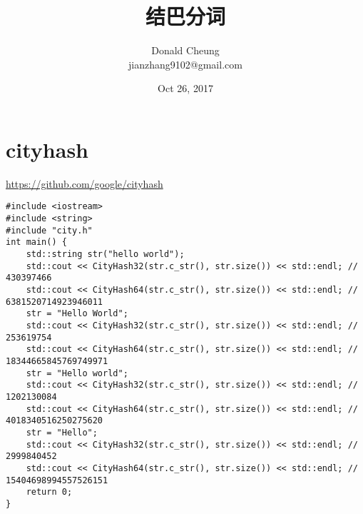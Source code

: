 \documentclass[10pt,a4paper]{ctexbook}
\begin{document}
    \setlength{\baselineskip}{20pt}
    \title{结巴分词}
    \author{Donald Cheung\\jianzhang9102@gmail.com}
    \date{Oct 26, 2017}
    \tableofcontents
\fi

\chapter{cityhash}
\url{https://github.com/google/cityhash}

\begin{verbatim}
#include <iostream>
#include <string>
#include "city.h"
int main() {
    std::string str("hello world");
    std::cout << CityHash32(str.c_str(), str.size()) << std::endl; // 430397466
    std::cout << CityHash64(str.c_str(), str.size()) << std::endl; // 6381520714923946011
    str = "Hello World";
    std::cout << CityHash32(str.c_str(), str.size()) << std::endl; // 253619754
    std::cout << CityHash64(str.c_str(), str.size()) << std::endl; // 18344665845769749971
    str = "Hello world";
    std::cout << CityHash32(str.c_str(), str.size()) << std::endl; // 1202130084
    std::cout << CityHash64(str.c_str(), str.size()) << std::endl; // 4018340516250275620
    str = "Hello";
    std::cout << CityHash32(str.c_str(), str.size()) << std::endl; // 2999840452
    std::cout << CityHash64(str.c_str(), str.size()) << std::endl; // 15404698994557526151
    return 0;
}
\end{verbatim}


\ifx\mlbook\undefined
    
\end{document}
